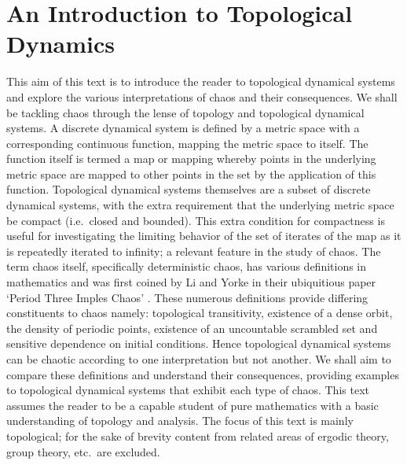 \documentclass[11pt,a4paper,oneside]{memoir}
\theoremstyle{plain}
\theoremstyle{definition}
\begin{document}
\newpage
\tableofcontents

\chapter{An Introduction to Topological Dynamics}
This aim of this text is to introduce the reader to topological dynamical systems and explore the various interpretations of chaos and their consequences. We shall be tackling chaos through the lense of topology and topological dynamical systems. A discrete dynamical system is defined by a metric space with a corresponding continuous function, mapping the metric space to itself. The function itself is termed a map or mapping whereby points in the underlying metric space are mapped to other points in the set by the application of this function. Topological dynamical systems themselves are a subset of discrete dynamical systems, with the extra requirement that the underlying metric space be compact (i.e.\ closed and bounded). This extra condition for compactness is useful for investigating the limiting behavior of the set of iterates of the map as it is repeatedly iterated to infinity; a relevant feature in the study of chaos. The term chaos itself, specifically deterministic chaos, has various definitions in mathematics and was first coined by Li and Yorke in their ubiquitious paper `Period Three Imples Chaos' \cite{li-yorke}. These numerous definitions provide differing constituents to chaos namely: topological transitivity, existence of a dense orbit, the density of periodic points, existence of an uncountable scrambled set and sensitive dependence on initial conditions. Hence topological dynamical systems can be chaotic according to one interpretation but not another. We shall aim to compare these definitions and understand their consequences, providing examples to topological dynamical systems that exhibit each type of chaos. This text assumes the reader to be a capable student of pure mathematics with a basic understanding of topology and analysis. The focus of this text is mainly topological; for the sake of brevity content from related areas of ergodic theory, group theory, etc.\ are excluded.
\end{document}
